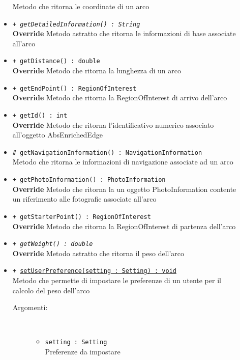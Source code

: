 \documentclass[../DefinizioneDiProdotto.tex]{subfiles}
\begin{document}
\begin{description}
\begin{itemize}
		Metodo che ritorna le coordinate di un arco
		\item \texttt{+ \textit{getDetailedInformation() : String}}\\
		\textbf{Override} Metodo astratto che ritorna le informazioni di base associate all'arco
		\item \texttt{+ getDistance() : double}\\
		\textbf{Override} Metodo che ritorna la lunghezza di un arco
		\item \texttt{+ getEndPoint() : RegionOfInterest}\\
		\textbf{Override} Metodo che ritorna la RegionOfInterest di arrivo dell'arco
		\item \texttt{+ getId() : int}\\
		\textbf{Override} Metodo che ritorna l'identificativo numerico associato all'oggetto AbsEnrichedEdge
		\item \texttt{\# getNavigationInformation() : NavigationInformation}\\
		Metodo che ritorna le informazioni di navigazione associate ad un arco
		\item \texttt{+ getPhotoInformation() : PhotoInformation}\\
		\textbf{Override} Metodo che ritorna la un oggetto PhotoInformation contente un riferimento alle fotografie associate all'arco
		\item \texttt{+ getStarterPoint() : RegionOfInterest}\\
		\textbf{Override} Metodo che ritorna la RegionOfInterest di partenza dell'arco
		\item \texttt{+ \textit{getWeight() : double}}\\
		\textbf{Override} Metodo astratto che ritorna il peso dell'arco
		\item \texttt{+ \underline{setUserPreference(setting : Setting) : void}}\\
		Metodo che permette di impostare le preferenze di un utente per il calcolo del peso dell'arco
		\begin{description}
			\item[Argomenti:] \
			\begin{itemize}
				\item \texttt{setting : Setting}\\
				Preferenze da impostare\end{itemize}
		\end{description}
	\end{itemize}
\end{description}
\end{document}
